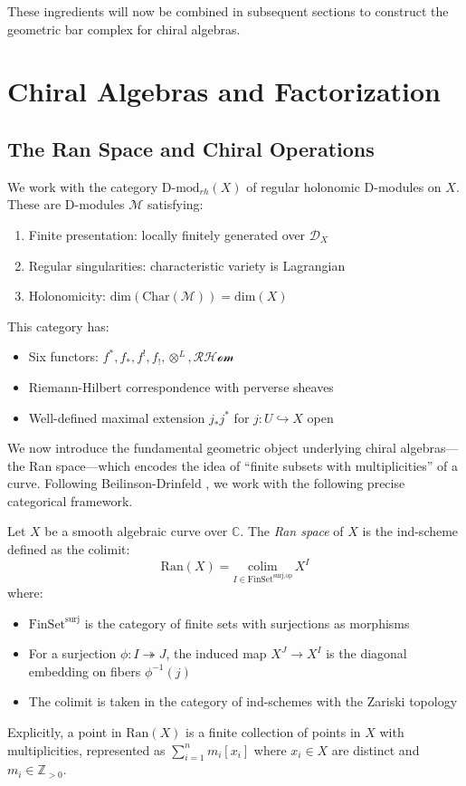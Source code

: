 These ingredients will now be combined in subsequent sections to construct the geometric bar complex for chiral algebras.
 
\section{Chiral Algebras and Factorization}
 
\subsection{The Ran Space and Chiral Operations}

\begin{definition}
We work with the category $\text{D-mod}_{rh}(X)$ of regular holonomic D-modules on $X$. 
These are D-modules $\mathcal{M}$ satisfying:
\begin{enumerate}
\item Finite presentation: locally finitely generated over $\mathcal{D}_X$
\item Regular singularities: characteristic variety is Lagrangian
\item Holonomicity: $\text{dim}(\text{Char}(\mathcal{M})) = \text{dim}(X)$
\end{enumerate}
This category has:
\begin{itemize}
\item Six functors: $f^*, f_*, f^!, f_!, \otimes^L, \mathcal{RHom}$
\item Riemann-Hilbert correspondence with perverse sheaves
\item Well-defined maximal extension $j_*j^*$ for $j: U \hookrightarrow X$ open
\end{itemize}
\end{definition}

We now introduce the fundamental geometric object underlying chiral algebras---the Ran space---which 
encodes the idea of ``finite subsets with multiplicities'' of a curve. Following Beilinson-Drinfeld 
\cite{BD04}, we work with the following precise categorical framework.
 
\begin{definition}\label{def:ran-precise}
Let $X$ be a smooth algebraic curve over $\mathbb{C}$. The \emph{Ran space} of $X$ is the ind-scheme 
defined as the colimit:
\[
\text{Ran}(X) = \underset{I \in \text{FinSet}^{\text{surj,op}}}{\text{colim}} \, X^I
\]
where:
\begin{itemize}
\item $\text{FinSet}^{\text{surj}}$ is the category of finite sets with surjections as morphisms
\item For a surjection $\phi: I \twoheadrightarrow J$, the induced map $X^J \to X^I$ is the diagonal 
embedding on fibers $\phi^{-1}(j)$
\item The colimit is taken in the category of ind-schemes with the Zariski topology
\end{itemize}
Explicitly, a point in $\text{Ran}(X)$ is a finite collection of points in $X$ with multiplicities,
represented as $\sum_{i=1}^n m_i[x_i]$ where $x_i \in X$ are distinct and $m_i \in \mathbb{Z}_{>0}$.
\end{definition}
 
